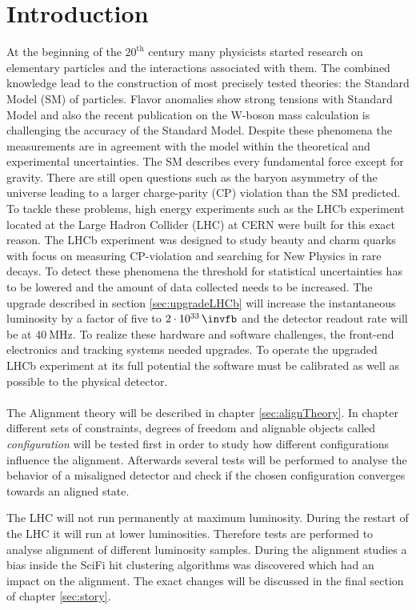 \chapter{Introduction}
\label{sec:einleitung}

At the beginning of the $20^{\text{th}}$ century many physicists started research on
elementary particles and the interactions associated with them. The combined
knowledge lead to the construction of most precisely tested theories: the
Standard Model (SM) of particles.
Flavor anomalies show strong tensions with Standard Model and also the recent publication on the W-boson mass calculation is challenging the accuracy of the Standard Model. Despite these phenomena the measurements are in agreement
with the model within the theoretical and experimental uncertainties.
The SM describes every fundamental force except for gravity. There are still open
questions such as the baryon asymmetry of the universe leading to a larger
charge-parity (CP) violation than the SM predicted.
To tackle these problems, high energy experiments such as the LHCb experiment located at the Large Hadron Collider (LHC) at CERN were built for this exact reason.
The LHCb experiment was designed to study beauty and charm quarks with focus on measuring CP-violation and searching for New Physics in rare decays.
To detect these phenomena the threshold for statistical uncertainties has to
be lowered and the amount of data collected needs to be increased. The upgrade
described in section \ref{sec:upgradeLHCb} will increase the instantaneous
luminosity by a factor of five to $\SI{2e33}{\invfb}$ and
the detector readout rate will be at $\SI{40}{\mega\hertz}$. To realize these
hardware and software challenges, the front-end electronics and tracking systems needed upgrades.
To operate the upgraded LHCb experiment at its full potential the software must be
calibrated as well as possible to the physical detector.
\\
\\
The Alignment theory will be described in chapter \ref{sec:alignTheory}.
In chapter \label{sec:story} different sets of constraints, degrees of freedom
and alignable objects called \textit{configuration} will be tested first in order
to study how different configurations influence the alignment. Afterwards several
tests will be performed to analyse the behavior of a misaligned detector and check
if the chosen configuration converges towards an aligned state.


The LHC will not run permanently at maximum luminosity. During the restart of the LHC it will run at lower luminosities. Therefore tests are performed to analyse alignment of different luminosity samples. During the alignment studies a bias inside the SciFi hit clustering algorithms was discovered which had an impact on the alignment. The exact changes will be discussed in the final section of chapter \ref{sec:story}.
